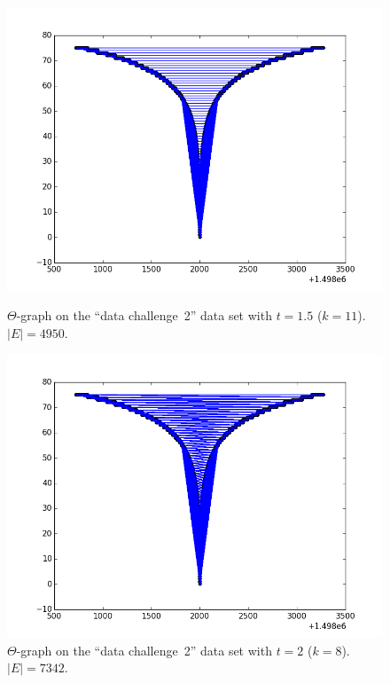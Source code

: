 \documentclass[a4paper,twoside,11pt,hidelinks]{article}
\theoremstyle{plain}
\theoremstyle{definition}  %
\begin{document}
\begin{figure}[h]
    \begin{minipage}[t]{0.48\textwidth}
        \centering
        \includegraphics[width=\textwidth]{figures/theta-dc-1_5}
        \caption{$\Theta$-graph on the ``data challenge~2'' data set with $t = 1.5$ ($k = 11$). $|E| = 4950$.}
        \label{fig:yao-dc-1.5}
    \end{minipage}
    \hfill
    \begin{minipage}[t]{0.48\textwidth}
        \centering
        \includegraphics[width=\textwidth]{figures/theta-dc-2}
        \caption{$\Theta$-graph on the ``data challenge~2'' data set with $t = 2$ ($k = 8$). $|E| = 7342$.}
        \label{fig:yao-dc-2}
    \end{minipage}
\end{figure}
\end{document}
